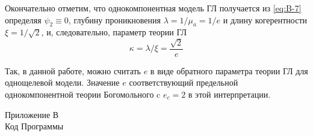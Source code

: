 Окончательно отметим, что однокомпонентная модель ГЛ получается из 
\eqref{eq:B-7} определяя \( \psi_2 \equiv 0 \), глубину проникновения
\( \lambda = 1/\mu_a = 1/e \) и длину когерентности
\( \xi = 1/\sqrt{2} \), и, следовательно, параметр теории ГЛ
\begin{equation}
  \kappa = \lambda/\xi = \frac{\sqrt{2}}{e}
  \label{eq:B-8}
\end{equation}

Так, в данной работе, можно считать \( e \) в виде обратного параметра теории 
ГЛ для однощелевой модели. Значение \( e \) соответствующий предельной 
однокомпонентной теории Богомольного c \( e_c = 2 \) в этой интерпретации.

\newpage

\begin{center}
    Приложение В\\
    Код Программы
\end{center}
